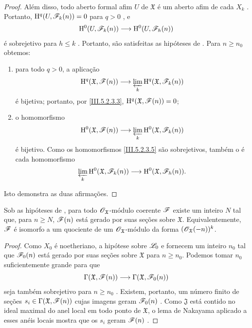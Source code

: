 \begin{proof}
Além disso, todo aberto formal afim $U$ de $\mathfrak{X}$ é um
aberto afim de cada $X_k$ . Portanto,
$\mathrm{H}^q(U,\mathscr{F}_k(n))=0$ para $q>0$ , e
\[
  \mathrm{H}^0(U,\mathscr{F}_k(n))
  \longrightarrow
  \mathrm{H}^0(U,\mathscr{F}_h(n))
\]
é sobrejetivo para $h\leq k$ . Portanto, são satisfeitas
as hipóteses de . Para $n\geq n_0$
obtemos:
\begin{enumerate}
  \item[$1^\circ$] para todo $q>0$, a aplicação
    \[
      \mathrm{H}^q(\mathfrak{X},\mathscr{F}(n))
      \longrightarrow
      \varprojlim_k
      \mathrm{H}^q(\mathfrak{X},\mathscr{F}_k(n))
    \]
    é bijetiva; portanto, por \eqref{III.5.2.3.3},
    $\mathrm{H}^q(\mathfrak{X},\mathscr{F}(n))=0$;
  \item[$2^\circ$] o homomorfismo
    \[
      \mathrm{H}^0(\mathfrak{X},\mathscr{F}(n))
      \longrightarrow
      \varprojlim_k
      \mathrm{H}^0(\mathfrak{X},\mathscr{F}_k(n))
    \]
    é bijetivo. Como os homomorfismos
    \eqref{III.5.2.3.5} são sobrejetivos, também o é cada homomorfismo
    \[
      \varprojlim_k
      \mathrm{H}^0(\mathfrak{X},\mathscr{F}_k(n))
      \longrightarrow
      \mathrm{H}^0(\mathfrak{X},\mathscr{F}_h(n)).
    \]
\end{enumerate}
Isto demonstra as duas afirmações.
\end{proof}

\begin{corollary}[5.2.4]
\label{III.5.2.4}
Sob as hipóteses de , para todo
$\mathscr{O}_{\mathfrak{X}}$-módulo coerente $\mathscr{F}$ existe um inteiro $N$
tal que, para $n\geq N$, $\mathscr{F}(n)$ está gerado por suas seções
sobre
$\mathfrak{X}$. Equivalentemente, $\mathscr{F}$ é isomorfo a um quociente
de um $\mathscr{O}_{\mathfrak{X}}$-módulo da forma
$(\mathscr{O}_{\mathfrak{X}}(-n))^k$.
\end{corollary}

\begin{proof}
Como $X_0$ é noetheriano, a hipótese sobre $\mathscr{L}_0$ e
 fornecem um inteiro $n_0$ tal que
$\mathscr{F}_0(n)$ está gerado por suas seções sobre $\mathfrak{X}$ para
$n\geq n_0$. Podemos tomar $n_0$ suficientemente grande para que
\[
  \Gamma(\mathfrak{X},\mathscr{F}(n))
  \longrightarrow
  \Gamma(\mathfrak{X},\mathscr{F}_0(n))
\]
seja também sobrejetivo para $n\geq n_0$ . Existem,
portanto, um número finito de seções
$s_i\in\Gamma(\mathfrak{X},\mathscr{F}(n))$ cujas imagens geram
$\mathscr{F}_0(n)$ . Como $\mathfrak{J}$ está
contido no ideal maximal do anel local em todo ponto
de $\mathfrak{X}$, o lema de Nakayama aplicado a esses anéis locais
mostra que os $s_i$ geram $\mathscr{F}(n)$
.
\end{proof}

